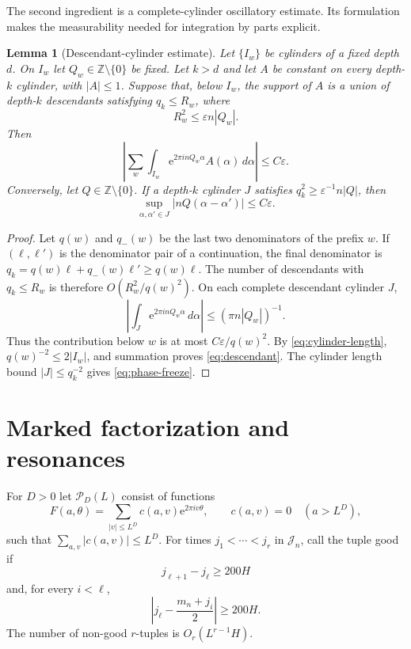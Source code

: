 \documentclass[11pt,a4paper]{amsart}
\newtheorem{lemma}[theorem]{Lemma}
\theoremstyle{definition}
\theoremstyle{remark}
\newcommand{\Z}{\mathbb Z}
\newcommand{\e}{\mathrm e}
\begin{document}
The second ingredient is a complete-cylinder oscillatory estimate.  Its
formulation makes the measurability needed for integration by parts explicit.

\begin{lemma}[Descendant-cylinder estimate]\label{lem:descendant}
Let $\{I_w\}$ be cylinders of a fixed depth $d$.  On $I_w$ let
$Q_w\in\Z\setminus\{0\}$ be fixed.  Let $k>d$ and let $A$ be constant on every
depth-$k$ cylinder, with $|A|\le1$.  Suppose that, below $I_w$, the support of
$A$ is a union of depth-$k$ descendants satisfying $q_k\le R_w$, where
\[
 R_w^2\le\varepsilon n|Q_w|.
\]
Then
\begin{equation}\label{eq:descendant}
 \left|\sum_w\int_{I_w}
       \e^{2\pi i nQ_w\alpha}A(\alpha)\,d\alpha\right|
 \le C\varepsilon.
\end{equation}
Conversely, let $Q\in\Z\setminus\{0\}$.  If a depth-$k$ cylinder $J$
satisfies $q_k^2\ge\varepsilon^{-1}n|Q|$, then
\begin{equation}\label{eq:phase-freeze}
 \sup_{\alpha,\alpha'\in J}|nQ(\alpha-\alpha')|
 \le C\varepsilon.
\end{equation}
\end{lemma}

\begin{proof}
Let $q(w)$ and $q_-(w)$ be the last two denominators of the prefix $w$.
If $(\ell,\ell')$ is the denominator pair of a continuation, the final
denominator is
$q_k=q(w)\ell+q_-(w)\ell'\ge q(w)\ell$.  The number of descendants with
$q_k\le R_w$ is therefore $O(R_w^2/q(w)^2)$.  On each complete descendant
cylinder $J$,
\[
 \left|\int_J\e^{2\pi i nQ_w\alpha}\,d\alpha\right|
 \le(\pi n|Q_w|)^{-1}.
\]
Thus the contribution below $w$ is at most $C\varepsilon/q(w)^2$.  By
\eqref{eq:cylinder-length}, $q(w)^{-2}\le2|I_w|$, and summation proves
\eqref{eq:descendant}.  The cylinder length bound $|J|\le q_k^{-2}$ gives
\eqref{eq:phase-freeze}.
\end{proof}


\section{Marked factorization and resonances}

For $D>0$ let $\mathcal P_D(L)$ consist of functions
\begin{equation}\label{eq:one-time-poly}
 F(a,\theta)=\sum_{|v|\le L^D}c(a,v)\e^{2\pi iv\theta},
 \qquad c(a,v)=0\quad(a>L^D),
\end{equation}
such that $\sum_{a,v}|c(a,v)|\le L^D$.  For times
$j_1<\cdots<j_r$ in $\mathcal J_n$, call the tuple good if
\begin{equation}\label{eq:good-tuple-separation}
 j_{\ell+1}-j_\ell\ge200H
\end{equation}
and, for every $i<\ell$,
\begin{equation}\label{eq:good-tuple-resonance}
 \left|j_\ell-\frac{m_n+j_i}{2}\right|\ge200H.
\end{equation}
The number of non-good $r$-tuples is $O_r(L^{r-1}H)$.
\end{document}
